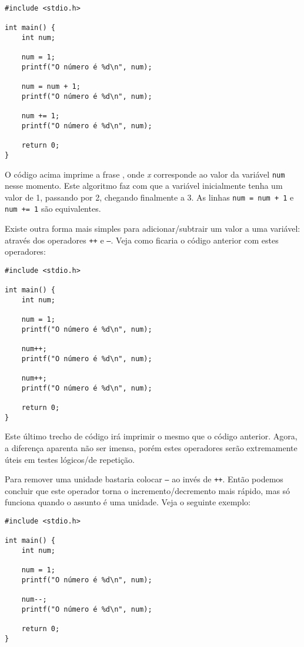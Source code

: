 \begin{lstlisting}
#include <stdio.h>  
   
int main() {     
    int num;  
  
    num = 1;  
    printf("O número é %d\n", num);  
  
    num = num + 1;  
    printf("O número é %d\n", num);  
   
    num += 1;  
    printf("O número é %d\n", num);  
   
    return 0;  
}   
\end{lstlisting}

O código acima imprime a frase , onde \textit{x} corresponde ao valor da variável \texttt{num} nesse momento. Este algoritmo faz com que a variável inicialmente tenha um valor de 1, passando por 2, chegando finalmente a 3. As linhas \texttt{num = num + 1} e \texttt{num += 1} são equivalentes.

Existe outra forma mais simples para adicionar/subtrair um valor a uma variável: através dos operadores \texttt{++} e \texttt{--}. Veja como ficaria o código anterior com estes operadores:

\begin{lstlisting}
#include <stdio.h>  
   
int main() {     
    int num;  
   
    num = 1;  
    printf("O número é %d\n", num);  
   
    num++;  
    printf("O número é %d\n", num);  
   
    num++;  
    printf("O número é %d\n", num);  
	   
    return 0;  
}  
\end{lstlisting}

Este último trecho de código irá imprimir o mesmo que o código anterior. Agora, a diferença aparenta não ser imensa, porém estes operadores serão extremamente úteis em testes lógicos/de repetição.

Para remover uma unidade bastaria colocar \texttt{--} ao invés de \texttt{++}. Então podemos concluir que este operador torna o incremento/decremento mais rápido, mas só funciona quando o assunto é uma unidade. Veja o seguinte exemplo:

\begin{lstlisting}
#include <stdio.h>  
   
int main() {     
    int num;  
   
    num = 1;  
    printf("O número é %d\n", num);  
  
    num--;  
    printf("O número é %d\n", num);  
   
    return 0;  
}  
\end{lstlisting}

